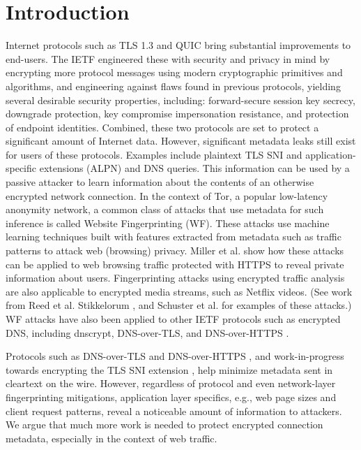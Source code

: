 \documentclass[runningheads]{llncs}
\begin{document}
\section{Introduction}
Internet protocols such as TLS 1.3 \cite{rfc8446} and QUIC \cite{ietf-quic-transport-16}
bring substantial improvements to end-users.
The IETF engineered these with security and privacy in mind by encrypting
more protocol messages using modern cryptographic primitives and algorithms, and engineering
against flaws found in previous protocols, yielding several desirable security
properties, including: forward-secure session key secrecy, downgrade protection, key
compromise impersonation resistance, and protection of endpoint identities.
Combined, these two protocols are set to protect a significant amount of Internet data.
However, significant metadata leaks still exist for users of these protocols. Examples include
plaintext TLS SNI and application-specific extensions (ALPN) and DNS queries. This information
can be used by a passive attacker to learn information about the contents of an otherwise
encrypted network connection. In the context of Tor, a popular low-latency anonymity
network, a common class of attacks that use metadata for such inference is called
Website Fingerprinting (WF). These attacks use machine learning techniques built with
features extracted from metadata such as traffic patterns to attack web (browsing) privacy.
Miller et al. \cite{miller2014know} show how these attacks can be applied to web browsing
traffic protected with HTTPS to reveal private information about users.
Fingerprinting attacks using encrypted traffic analysis are also applicable to encrypted
media streams, such as Netflix videos. (See work from Reed et al. \cite{reed2017identifying}
Stikkelorum \cite{stikkelorum2017know}, and Schuster et al. \cite{schuster2017beauty}
for examples of these attacks.) WF attacks have also been applied to other IETF
protocols such as encrypted DNS, including dnscrypt, DNS-over-TLS,
and DNS-over-HTTPS \cite{siby2018dns,shulman2014pretty}.

Protocols such as DNS-over-TLS and DNS-over-HTTPS \cite{rfc8484}, and work-in-progress
towards encrypting the TLS SNI extension \cite{ietf-tls-esni-02}, help minimize metadata sent
in cleartext on the wire. However, regardless of protocol and even network-layer fingerprinting
mitigations, application layer specifics, e.g., web page sizes and client
request patterns, reveal a noticeable amount of information to attackers. We argue
that much more work is needed to protect encrypted connection metadata, especially
in the context of web traffic.
\end{document}
